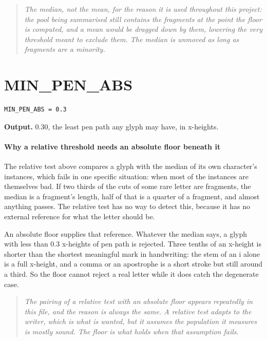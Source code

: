 \begin{quote}\small\itshape The median, not the mean, for the reason it is used throughout this project: the pool being summarised still contains the fragments at the point the floor is computed, and a mean would be dragged down by them, lowering the very threshold meant to exclude them. The median is unmoved as long as fragments are a minority.\end{quote}

\section{MIN\_PEN\_ABS}
\begin{lstlisting}[style=sig]
MIN_PEN_ABS = 0.3
\end{lstlisting}

\noindent\textbf{Output.} 0.30, the least pen path any glyph may have, in x-heights.


\paragraph{Why a relative threshold needs an absolute floor beneath it}
The relative test above compares a glyph with the median of its own character's instances, which fails in one specific situation: when most of the instances are themselves bad. If two thirds of the cuts of some rare letter are fragments, the median is a fragment's length, half of that is a quarter of a fragment, and almost anything passes. The relative test has no way to detect this, because it has no external reference for what the letter should be.

An absolute floor supplies that reference. Whatever the median says, a glyph with less than 0.3 x-heights of pen path is rejected. Three tenths of an x-height is shorter than the shortest meaningful mark in handwriting: the stem of an i alone is a full x-height, and a comma or an apostrophe is a short stroke but still around a third. So the floor cannot reject a real letter while it does catch the degenerate case.


\begin{quote}\small\itshape The pairing of a relative test with an absolute floor appears repeatedly in this file, and the reason is always the same. A relative test adapts to the writer, which is what is wanted, but it assumes the population it measures is mostly sound. The floor is what holds when that assumption fails.\end{quote}

